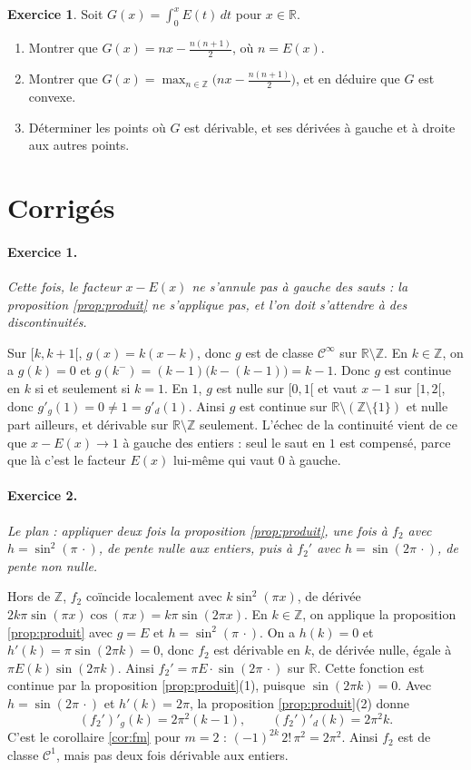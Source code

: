 \documentclass[11pt,a4paper]{article}
\theoremstyle{plain}
\theoremstyle{definition}
\newtheorem{exercice}{Exercice}
\theoremstyle{remark}
\newcommand{\Z}{\mathbb{Z}}
\newcommand{\R}{\mathbb{R}}
\newcommand{\Cc}{\mathcal{C}}
\newcommand{\1}{\mathbf{1}}
\begin{document}
\begin{exercice}
Soit $G(x)=\int_0^xE(t)\,dt$ pour $x\in\R$.
\begin{enumerate}[nosep]
\item Montrer que $G(x)=nx-\frac{n(n+1)}2$, où $n=E(x)$.
\item Montrer que $G(x)=\max_{n\in\Z}\big(nx-\frac{n(n+1)}2\big)$, et en déduire que $G$ est convexe.
\item Déterminer les points où $G$ est dérivable, et ses dérivées à gauche et à droite aux autres points.
\end{enumerate}
\end{exercice}

\section{Corrigés}

\paragraph{Exercice 1.} \emph{Cette fois, le facteur $x-E(x)$ ne s'annule pas à gauche des sauts : la proposition \ref{prop:produit} ne s'applique pas, et l'on doit s'attendre à des discontinuités.}

Sur $[k,k+1[$, $g(x)=k(x-k)$, donc $g$ est de classe $\Cc^\infty$ sur $\R\setminus\Z$. En $k\in\Z$, on a $g(k)=0$ et $g(k^-)=(k-1)\big(k-(k-1)\big)=k-1$. Donc $g$ est continue en $k$ si et seulement si $k=1$. En $1$, $g$ est nulle sur $[0,1[$ et vaut $x-1$ sur $[1,2[$, donc $g'_g(1)=0\neq1=g'_d(1)$. Ainsi $g$ est continue sur $\R\setminus(\Z\setminus\{1\})$ et nulle part ailleurs, et dérivable sur $\R\setminus\Z$ seulement. L'échec de la continuité vient de ce que $x-E(x)\to1$ à gauche des entiers : seul le saut en $1$ est compensé, parce que là c'est le facteur $E(x)$ lui-même qui vaut $0$ à gauche.

\paragraph{Exercice 2.} \emph{Le plan : appliquer deux fois la proposition \ref{prop:produit}, une fois à $f_2$ avec $h=\sin^2(\pi\,\cdot)$, de pente nulle aux entiers, puis à $f_2'$ avec $h=\sin(2\pi\,\cdot)$, de pente non nulle.}

Hors de $\Z$, $f_2$ coïncide localement avec $k\sin^2(\pi x)$, de dérivée $2k\pi\sin(\pi x)\cos(\pi x)=k\pi\sin(2\pi x)$. En $k\in\Z$, on applique la proposition \ref{prop:produit} avec $g=E$ et $h=\sin^2(\pi\,\cdot)$. On a $h(k)=0$ et $h'(k)=\pi\sin(2\pi k)=0$, donc $f_2$ est dérivable en $k$, de dérivée nulle, égale à $\pi E(k)\sin(2\pi k)$. Ainsi $f_2'=\pi E\cdot\sin(2\pi\,\cdot)$ sur $\R$. Cette fonction est continue par la proposition \ref{prop:produit}(1), puisque $\sin(2\pi k)=0$. Avec $h=\sin(2\pi\,\cdot)$ et $h'(k)=2\pi$, la proposition \ref{prop:produit}(2) donne
\[
  (f_2')'_g(k)=2\pi^2(k-1), \qquad (f_2')'_d(k)=2\pi^2k .
\]
C'est le corollaire \ref{cor:fm} pour $m=2$ : $(-1)^{2k}\,2!\,\pi^2=2\pi^2$. Ainsi $f_2$ est de classe $\Cc^1$, mais pas deux fois dérivable aux entiers.
\end{document}
